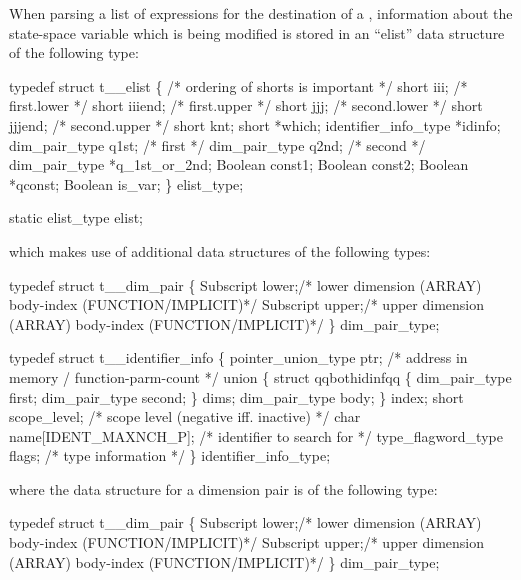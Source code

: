 % 
% 

When parsing a list of expressions for the destination of a ,
information about the state-space variable which is being modified is
stored in an ``elist'' data structure of the following type:
\begin{codeexample}
typedef struct t__elist
   \{  /* ordering of shorts is important */
      short iii;     /* first.lower */
      short iiiend;  /* first.upper */
      short jjj;     /* second.lower */
      short jjjend;  /* second.upper */
      short knt;
      short *which;
      identifier_info_type *idinfo;
      dim_pair_type q1st; /* first */
      dim_pair_type q2nd; /* second */
      dim_pair_type *q_1st_or_2nd;
      Boolean const1;
      Boolean const2;
      Boolean *qconst;
      Boolean is_var;
   \} elist_type;

static elist_type elist;
\end{codeexample}

which makes use of additional data structures of the following types:
\begin{codeexample}
typedef struct t__dim_pair
  \{
    Subscript lower;/* lower dimension (ARRAY) body-index (FUNCTION/IMPLICIT)*/
    Subscript upper;/* upper dimension (ARRAY) body-index (FUNCTION/IMPLICIT)*/
  \} dim_pair_type;
\end{codeexample}

\begin{codeexample}
typedef struct t__identifier_info
  \{
     pointer_union_type ptr;    /* address in memory / function-parm-count */
     union
        \{
           struct qqbothidinfqq
              \{
                 dim_pair_type first;
                 dim_pair_type second;
              \} dims;
           dim_pair_type body;
        \} index;
     short scope_level;         /* scope level (negative iff. inactive) */
     char name[IDENT_MAXNCH_P]; /* identifier to search for */
     type_flagword_type flags;  /* type information */
  \} identifier_info_type;
\end{codeexample}
where the data structure for a dimension pair is of the following type:
\begin{codeexample}
typedef struct t__dim_pair
  \{
    Subscript lower;/* lower dimension (ARRAY) body-index (FUNCTION/IMPLICIT)*/
    Subscript upper;/* upper dimension (ARRAY) body-index (FUNCTION/IMPLICIT)*/
  \} dim_pair_type;
\end{codeexample}

